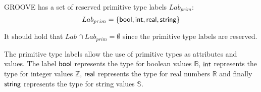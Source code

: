 \begin{defin}
\label{defin:formalisations:groove_formalisation:definitions:primitive_type_labels}
GROOVE has a set of reserved primitive type labels $Lab_{prim}$:
\begin{equation*}
    Lab_{prim} = \{ \mathsf{bool}, \mathsf{int}, \mathsf{real}, \mathsf{string} \}
\end{equation*}

It should hold that $Lab \cap Lab_{prim} = \emptyset$ since the primitive type labels are reserved.
\end{defin}

The primitive type labels allow the use of primitive types as attributes and values. The label $\mathsf{bool}$ represents the type for boolean values $\mathbb{B}$, $\mathsf{int}$ represents the type for integer values $\mathbb{Z}$, $\mathsf{real}$ represents the type for real numbers $\mathbb{R}$ and finally $\mathsf{string}$ represents the type for string values $\mathbb{S}$.